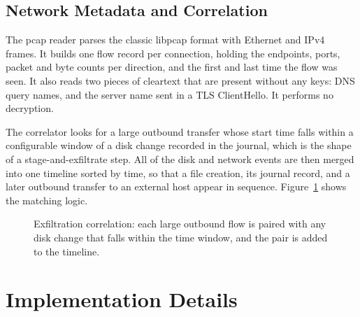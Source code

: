 \documentclass[12pt,onecolumn]{IEEEtran}
\begin{document}
\subsection{Network Metadata and Correlation}
The pcap reader parses the classic libpcap format with Ethernet and IPv4 frames. It builds one flow record per connection, holding the endpoints, ports, packet and byte counts per direction, and the first and last time the flow was seen. It also reads two pieces of cleartext that are present without any keys: DNS query names, and the server name sent in a TLS ClientHello. It performs no decryption.

The correlator looks for a large outbound transfer whose start time falls within a configurable window of a disk change recorded in the journal, which is the shape of a stage-and-exfiltrate step. All of the disk and network events are then merged into one timeline sorted by time, so that a file creation, its journal record, and a later outbound transfer to an external host appear in sequence. Figure~\ref{fig:corr} shows the matching logic.

\begin{figure}[htbp]
\centering
{}
\caption{Exfiltration correlation: each large outbound flow is paired with any
disk change that falls within the time window, and the pair is added to the
timeline.}
\label{fig:corr}
\end{figure}

\section{Implementation Details}
\end{document}

